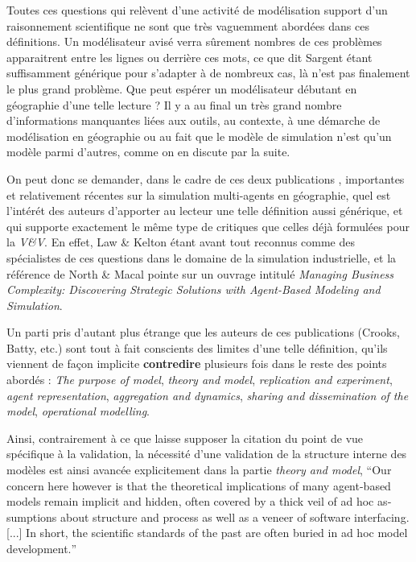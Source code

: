 Toutes ces questions qui relèvent d'une activité de modélisation support d'un raisonnement scientifique ne sont que très vaguemment abordées dans ces définitions. Un modélisateur avisé verra sûrement nombres de ces problèmes apparaitrent entre les lignes ou derrière ces mots, ce que dit Sargent étant suffisamment générique pour s'adapter à de nombreux cas, là n'est pas finalement le plus grand problème. Que peut espérer un modélisateur débutant en géographie d'une telle lecture ? Il y a au final un très grand nombre d'informations manquantes liées aux outils, au contexte, à une démarche de modélisation en géographie ou au fait que le modèle de simulation n'est qu'un modèle parmi d'autres, comme on en discute par la suite.

On peut donc se demander, dans le cadre de ces deux publications \autocite{Crooks2008,Crooks2012}, importantes et relativement récentes sur la simulation multi-agents en géographie, quel est l'intérét des auteurs d'apporter au lecteur une telle définition aussi générique, et qui supporte exactement le même type de critiques que celles déjà formulées pour la \textit{V\&V}. En effet, Law \& Kelton étant avant tout reconnus comme des spécialistes de ces questions dans le domaine de la simulation industrielle, et la référence de North \& Macal pointe sur un ouvrage intitulé \textit{Managing Business Complexity: Discovering Strategic Solutions with Agent-Based Modeling and Simulation}.

Un parti pris d'autant plus étrange que les auteurs de ces publications (Crooks, Batty, etc.) sont tout à fait conscients des limites d'une telle définition, qu'ils viennent de façon implicite \textbf{contredire} plusieurs fois dans le reste des points abordés : \textit{The purpose of model}, \textit{theory and model}, \textit{replication and experiment}, \textit{agent representation}, \textit{aggregation and dynamics}, \textit{sharing and dissemination of the model}, \textit{operational modelling}.

Ainsi, contrairement à ce que laisse supposer la citation du point de vue spécifique à la validation, la nécessité d'une validation de la structure interne des modèles est ainsi avancée explicitement dans la partie \textit{theory and model}, \foreignquote{english}{Our concern here however is that the theoretical implications of many agent-based models remain implicit and hidden, often covered by a thick veil of ad hoc assumptions about structure and process as well as a veneer of software interfacing. [...] In short, the scientific standards of the past are often buried in ad hoc model development.}

